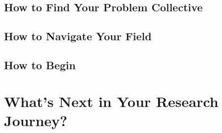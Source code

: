 \documentclass[11pt]{article}
\begin{document}
\subsection{How to Find Your Problem Collective}
\subsection{How to Navigate Your Field}
\subsection{How to Begin}

\section{What's Next in Your Research Journey?}


\newpage


\end{document}
